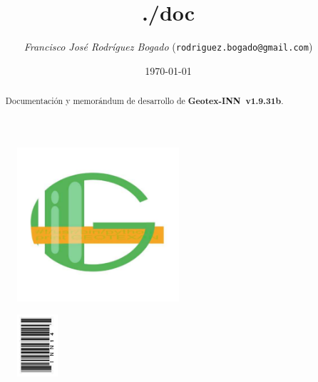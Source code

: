 \documentclass[a4paper]{article}
\newcommand{\marginalnote}[1]{\mbox{}\marginpar{\raggedright\hspace{0pt}#1}}
\newcommand{\iconomargen}[2]{%
  \marginalnote{%
    \parbox[t][\baselineskip * (#1-1)][b]{\marginparwidth}{%
      \texttt{[image: \#2]}%
    }
  }
}
\begin{document}
    \title{\Huge ./doc} 

  \begin{figure}
    \begin{center}
      \includegraphics[width=6cm]{logo}
    \end{center}
  \end{figure}
  
    \author{\large \textit{Francisco José Rodríguez Bogado} (\texttt{rodriguez.bogado@gmail.com})} 
    \date{\Large \today}
    \maketitle
    

  
    \begin{abstract}
    Documentación y memorándum de desarrollo de \Large \textbf{Geotex-INN~v1.9.31b}.
    \end{abstract}

  \begin{figure}
    \begin{flushright}
      \includegraphics[width=1.5cm]{inn14}
    \end{flushright}
  \end{figure}
  
    \newpage

\renewcommand{\headwidth}{\textwidth}
\renewcommand{\headrulewidth}{0.4pt}
\renewcommand{\footrulewidth}{0.4pt}
\chead{}
\rfoot{\thepage}
\cfoot{}
    
\end{document}

